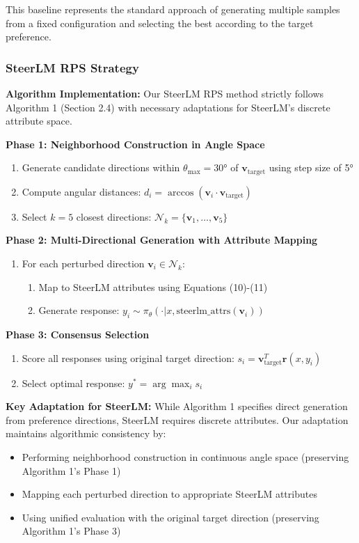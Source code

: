 \documentclass{article} %
\begin{document}
This baseline represents the standard approach of generating multiple samples from a fixed configuration and selecting the best according to the target preference.

\subsubsection{SteerLM RPS Strategy}

\textbf{Algorithm Implementation:} Our SteerLM RPS method strictly follows Algorithm 1 (Section 2.4) with necessary adaptations for SteerLM's discrete attribute space.

\textbf{Phase 1: Neighborhood Construction in Angle Space}
\begin{enumerate}
    \item Generate candidate directions within $\theta_{\max} = 30°$ of $\mathbf{v}_{\text{target}}$ using step size of 5°
    \item Compute angular distances: $d_i = \arccos(\mathbf{v}_i \cdot \mathbf{v}_{\text{target}})$
    \item Select $k=5$ closest directions: $\mathcal{N}_k = \{\mathbf{v}_1, \ldots, \mathbf{v}_5\}$
\end{enumerate}

\textbf{Phase 2: Multi-Directional Generation with Attribute Mapping}
\begin{enumerate}
    \item For each perturbed direction $\mathbf{v}_i \in \mathcal{N}_k$:
    \begin{enumerate}
        \item Map to SteerLM attributes using Equations (10)-(11)
        \item Generate response: $y_i \sim \pi_\theta(\cdot | x, \text{steerlm\_attrs}(\mathbf{v}_i))$
    \end{enumerate}
\end{enumerate}

\textbf{Phase 3: Consensus Selection}
\begin{enumerate}
    \item Score all responses using original target direction: $s_i = \mathbf{v}_{\text{target}}^T \mathbf{r}(x, y_i)$
    \item Select optimal response: $y^* = \arg\max_i s_i$
\end{enumerate}

\textbf{Key Adaptation for SteerLM:} While Algorithm 1 specifies direct generation from preference directions, SteerLM requires discrete attributes. Our adaptation maintains algorithmic consistency by:
\begin{itemize}
    \item Performing neighborhood construction in continuous angle space (preserving Algorithm 1's Phase 1)
    \item Mapping each perturbed direction to appropriate SteerLM attributes
    \item Using unified evaluation with the original target direction (preserving Algorithm 1's Phase 3)
\end{itemize}
\end{document}
